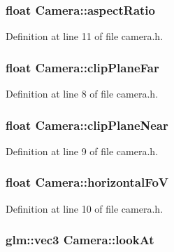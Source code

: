 \subsubsection[{aspect\+Ratio}]{\setlength{\rightskip}{0pt plus 5cm}float Camera\+::aspect\+Ratio}\label{class_camera_aa6f013fdb4560daaa5ca6ace1a846ca7}


Definition at line 11 of file camera.\+h.

\hypertarget{class_camera_a55581df24efcf3c7435cf34faa96aca6}{}
\subsubsection[{clip\+Plane\+Far}]{\setlength{\rightskip}{0pt plus 5cm}float Camera\+::clip\+Plane\+Far}\label{class_camera_a55581df24efcf3c7435cf34faa96aca6}


Definition at line 8 of file camera.\+h.

\hypertarget{class_camera_aa4d30db62c0140589c1e332d496b142d}{}
\subsubsection[{clip\+Plane\+Near}]{\setlength{\rightskip}{0pt plus 5cm}float Camera\+::clip\+Plane\+Near}\label{class_camera_aa4d30db62c0140589c1e332d496b142d}


Definition at line 9 of file camera.\+h.

\hypertarget{class_camera_a626d2ed03f88d6a740590117b5c9b72b}{}
\subsubsection[{horizontal\+Fo\+V}]{\setlength{\rightskip}{0pt plus 5cm}float Camera\+::horizontal\+Fo\+V}\label{class_camera_a626d2ed03f88d6a740590117b5c9b72b}


Definition at line 10 of file camera.\+h.

\hypertarget{class_camera_a4cc07d9240227ef5d11fdaad14822b08}{}
\subsubsection[{look\+At}]{\setlength{\rightskip}{0pt plus 5cm}glm\+::vec3 Camera\+::look\+At}\label{class_camera_a4cc07d9240227ef5d11fdaad14822b08}



